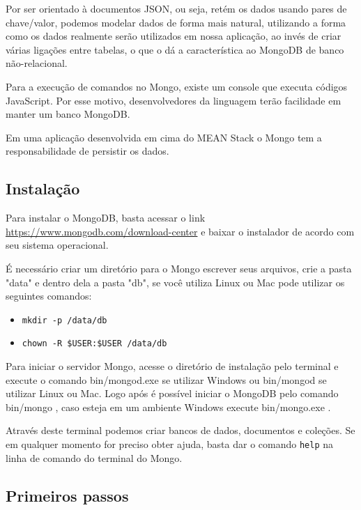 \documentclass[
	12pt,				%
	openright,			%
	twoside,			%
	a4paper,			%
	english,			%
	brazil				%
	]{abntex2}
\begin{document}
Por ser orientado à documentos JSON, ou seja, retém os dados usando pares de chave/valor, podemos modelar dados de forma mais natural, utilizando a forma como os dados realmente serão utilizados em nossa aplicação, ao invés de criar várias ligações entre tabelas, o que o dá a característica ao MongoDB de banco não-relacional.

Para a execução de comandos no Mongo, existe um console que executa códigos JavaScript. Por esse motivo, desenvolvedores da linguagem terão facilidade em manter um banco MongoDB.

Em uma aplicação desenvolvida em cima do MEAN Stack o Mongo tem a responsabilidade de persistir os dados.

\subsection{Instalação}

Para instalar o MongoDB, basta acessar o link \url{https://www.mongodb.com/download-center} e baixar o instalador de acordo com seu sistema operacional.

É necessário criar um diretório para o Mongo escrever seus arquivos, crie a pasta "data" e dentro dela a pasta "db", se você utiliza Linux ou Mac pode utilizar os seguintes comandos:

\begin{itemize}
\item \verb|mkdir -p /data/db|
\item \verb|chown -R $USER:$USER /data/db|
\end{itemize}

Para iniciar o servidor Mongo, acesse o diretório de instalação pelo terminal e execute o comando bin/mongod.exe se utilizar Windows ou bin/mongod se utilizar Linux ou Mac. Logo após é possível iniciar o MongoDB pelo comando bin/mongo , caso esteja em um ambiente Windows execute bin/mongo.exe .

Através deste terminal podemos criar bancos de dados, documentos e coleções. Se em qualquer momento for preciso obter ajuda, basta dar o comando \verb|help| na linha de comando do terminal do Mongo.

\subsection{Primeiros passos}
\end{document}
